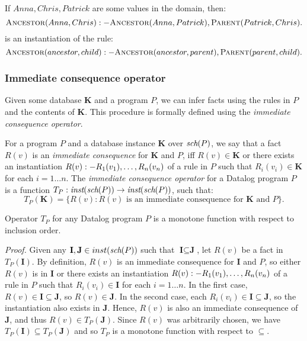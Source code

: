 \begin{exmp}
If $Anna, Chris, Patrick$ are some values in the domain, then:
$$\textsc{Ancestor}(Anna, Chris) :- \textsc{Ancestor} (Anna, Patrick), \textsc{Parent} (Patrick, Chris).$$
is an instantiation of the rule: 
$$\textsc{Ancestor} (ancestor, child) :- \textsc{Ancestor} (ancestor, parent), \textsc{Parent} (parent, child).$$
\end{exmp}

\subsubsection{Immediate consequence operator}
Given some database $\textbf{K}$ and a program $P$, we can infer facts using the rules in $P$ and the contents of $\textbf{K}$. This procedure is formally defined using the \emph{immediate consequence operator}.

\begin{defn}

For a program $P$ and a database instance $\textbf{K}$ over $\textit{sch}(P)$, we say that a fact $R(v)$ is an \emph{immediate consequence} for $\textbf{K}$ and $P$, iff $R(v) \in \textbf{K}$ or there exists an instantiation $R(v) :- R_1(v_1), \dots, R_n(v_n)$ of a rule in $P$ such that $R_i(v_i) \in \textbf{K}$ for each $i = 1\dots n$. The \emph{immediate consequence operator} for a Datalog program $P$ is a function $T_P: \textit{inst}(\textit{sch}(P)) \to \textit{inst}(\textit{sch}(P))$, such that:
$$T_P(\textbf{K}) = \{ R(v): R(v) \text{ is an immediate consequence for } \textbf{K} \text{ and } P \}.$$

\end{defn}

\begin{lem}
Operator $T_P$ for any Datalog program $P$ is a monotone function with respect to inclusion order.
\end{lem}
\emph{Proof.} Given any $\textbf{I}, \textbf{J} \in inst(\textit{sch}(P))$ such that $\textbf{I} \subseteq \textbf{J}$, let $R(v)$ be a fact in $T_P(\textbf{I})$.
By definition, $R(v)$ is an immediate consequence for $\textbf{I}$ and $P$, so either $R(v)$ is in $\textbf{I}$ or there exists an instantiation
 $R(v) :- R_1(v_1), \dots, R_n(v_n)$ of a rule in $P$ such that $R_i(v_i) \in \textbf{I}$ for each $i = 1\dots n$. 
In the first case, $R(v) \in \textbf{I} \subseteq \textbf{J}$, so $R(v) \in \textbf{J}$. 
In the second case, each $R_i(v_i) \in \textbf{I} \subseteq \textbf{J}$, so the instantiation also exists in $\textbf{J}$. 
Hence, $R(v)$ is also an immediate consequence of $\textbf{J}$, and thus $R(v) \in T_P(\textbf{J})$. 
Since $R(v)$ was arbitrarily chosen, we have  $T_P(\textbf{I}) \subseteq T_P(\textbf{J})$ and so $T_P$ is a monotone function with respect to $\subseteq$.

